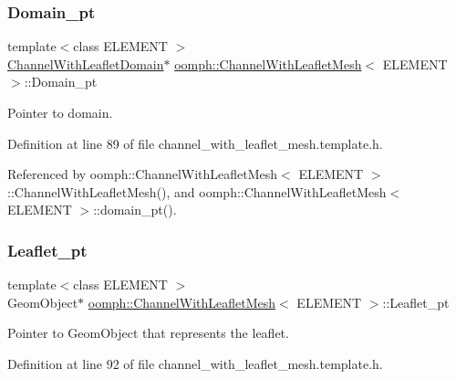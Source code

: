 \subsubsection{\texorpdfstring{Domain\+\_\+pt}{Domain\_pt}}
{\footnotesize\ttfamily template$<$class E\+L\+E\+M\+E\+NT $>$ \\
\hyperlink{classoomph_1_1ChannelWithLeafletDomain}{Channel\+With\+Leaflet\+Domain}$\ast$ \hyperlink{classoomph_1_1ChannelWithLeafletMesh}{oomph\+::\+Channel\+With\+Leaflet\+Mesh}$<$ E\+L\+E\+M\+E\+NT $>$\+::Domain\+\_\+pt\hspace{0.3cm}{\ttfamily [protected]}}



Pointer to domain. 



Definition at line 89 of file channel\+\_\+with\+\_\+leaflet\+\_\+mesh.\+template.\+h.



Referenced by oomph\+::\+Channel\+With\+Leaflet\+Mesh$<$ E\+L\+E\+M\+E\+N\+T $>$\+::\+Channel\+With\+Leaflet\+Mesh(), and oomph\+::\+Channel\+With\+Leaflet\+Mesh$<$ E\+L\+E\+M\+E\+N\+T $>$\+::domain\+\_\+pt().

\mbox{\label{classoomph_1_1ChannelWithLeafletMesh_ab0d744f2c35b9397dd35cc75a2db9e60}} 
\subsubsection{\texorpdfstring{Leaflet\+\_\+pt}{Leaflet\_pt}}
{\footnotesize\ttfamily template$<$class E\+L\+E\+M\+E\+NT $>$ \\
Geom\+Object$\ast$ \hyperlink{classoomph_1_1ChannelWithLeafletMesh}{oomph\+::\+Channel\+With\+Leaflet\+Mesh}$<$ E\+L\+E\+M\+E\+NT $>$\+::Leaflet\+\_\+pt\hspace{0.3cm}{\ttfamily [protected]}}



Pointer to Geom\+Object that represents the leaflet. 



Definition at line 92 of file channel\+\_\+with\+\_\+leaflet\+\_\+mesh.\+template.\+h.



